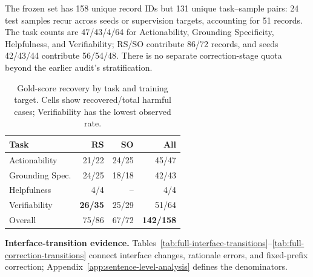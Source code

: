 The frozen set has 158 unique record IDs but 131 unique task--sample pairs:
24 test samples recur across seeds or supervision targets, accounting for 51
records. The task counts are 47/43/4/64 for Actionability, Grounding
Specificity, Helpfulness, and Verifiability; RS/SO contribute 86/72 records,
and seeds 42/43/44 contribute 56/54/48. There is no separate correction-stage
quota beyond the earlier audit's stratification.

\begin{table}[!tp]
\centering
\captionsetup{font=normalsize,skip=2pt}
\small
\setlength{\tabcolsep}{8pt}
\renewcommand{\arraystretch}{1.05}

\begin{tabular}{@{}lrrr@{}}
\toprule
Task & RS & SO & All \\
\midrule

Actionability
& 21/22 & 24/25 & 45/47 \\

Grounding Spec.
& 24/25 & 18/18 & 42/43 \\

Helpfulness
& 4/4 & -- & 4/4 \\

Verifiability
& \textbf{26/35} & 25/29 & 51/64 \\

\midrule
Overall
& 75/86 & 67/72 & \textbf{142/158} \\
\bottomrule
\end{tabular}

\caption{Gold-score recovery by task and training target. Cells show
recovered/total harmful cases; Verifiability has the lowest observed rate.}
\label{tab:full-correction-task}
\end{table}

\begingroup
\fontsize{10pt}{11.2pt}\selectfont

\noindent\textbf{Interface-transition evidence.}
Tables~\ref{tab:full-interface-transitions}--\ref{tab:full-correction-transitions}
connect interface changes, rationale errors, and fixed-prefix correction;
Appendix~\ref{app:sentence-level-analysis} defines the denominators.
\par
\endgroup

